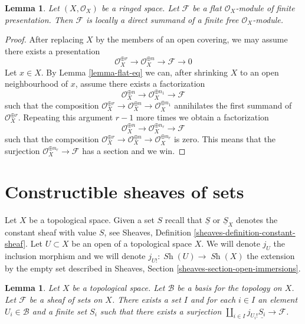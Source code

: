 \documentclass{stacks-project}
\theoremstyle{plain}
\newtheorem{lemma}[subsection]{Lemma}
\theoremstyle{definition}
\theoremstyle{remark}
\numberwithin{equation}{subsection}
\def\Sh{\mathop{\mathit{Sh}}\nolimits}
\begin{document}
\begin{lemma}
\label{lemma-flat-locally-finite-presentation}
Let $(X, \mathcal{O}_X)$ be a ringed space. Let $\mathcal{F}$ be a
flat $\mathcal{O}_X$-module of finite presentation. Then $\mathcal{F}$ is
locally a direct summand of a finite free $\mathcal{O}_X$-module.
\end{lemma}

\begin{proof}
After replacing $X$ by the members of an open covering, we may
assume there exists a presentation
$$
\mathcal{O}_X^{\oplus r} \to
\mathcal{O}_X^{\oplus n} \to \mathcal{F} \to 0
$$
Let $x \in X$. By Lemma \ref{lemma-flat-eq}
we can, after shrinking $X$ to an open
neighbourhood of $x$, assume there exists a factorization
$$
\mathcal{O}_X^{\oplus n} \to
\mathcal{O}_X^{\oplus n_1} \to \mathcal{F}
$$
such that the composition
$\mathcal{O}_X^{\oplus r} \to \mathcal{O}_X^{\oplus n} \to
\mathcal{O}_X^{\oplus n_1}$
annihilates the first summand of $\mathcal{O}_X^{\oplus r}$.
Repeating this argument $r - 1$ more times we obtain a factorization
$$
\mathcal{O}_X^{\oplus n} \to
\mathcal{O}_X^{\oplus n_r} \to \mathcal{F}
$$
such that the composition
$\mathcal{O}_X^{\oplus r} \to \mathcal{O}_X^{\oplus n}
\to \mathcal{O}_X^{\oplus n_r}$ is zero.
This means that the surjection $\mathcal{O}_X^{\oplus n_r} \to \mathcal{F}$
has a section and we win.
\end{proof}







\section{Constructible sheaves of sets}
\label{section-constructible}

\noindent
Let $X$ be a topological space. Given a set $S$ recall that $\underline{S}$
or $\underline{S}_X$ denotes the constant sheaf with value $S$, see
Sheaves, Definition \ref{sheaves-definition-constant-sheaf}.
Let $U \subset X$ be an open of a topological space $X$.
We will denote $j_U$ the inclusion morphism and we will denote
$j_{U!} : \Sh(U) \to \Sh(X)$ the extension by the empty set
described in Sheaves, Section \ref{sheaves-section-open-immersions}.

\begin{lemma}
\label{lemma-surjection}
Let $X$ be a topological space. Let $\mathcal{B}$ be a basis for the
topology on $X$. Let $\mathcal{F}$ be a sheaf of sets on $X$.
There exists a set $I$ and for each $i \in I$ an element
$U_i \in \mathcal{B}$ and a finite set $S_i$ such that there exists
a surjection $\coprod_{i \in I} j_{U_i!}\underline{S_i} \to \mathcal{F}$.
\end{lemma}
\end{document}
